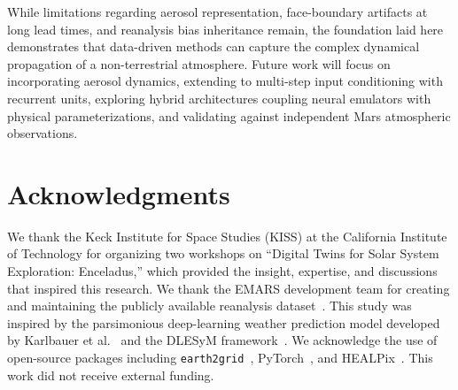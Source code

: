 \documentclass[11pt, a4paper, twocolumn]{article}
\begin{document}
While limitations regarding aerosol representation, face-boundary artifacts at long lead times, and reanalysis bias inheritance remain, the foundation laid here demonstrates that data-driven methods can capture the complex dynamical propagation of a non-terrestrial atmosphere. Future work will focus on incorporating aerosol dynamics, extending to multi-step input conditioning with recurrent units, exploring hybrid architectures coupling neural emulators with physical parameterizations, and validating against independent Mars atmospheric observations.

\section*{Acknowledgments}

We thank the Keck Institute for Space Studies (KISS) at the California Institute of Technology for organizing two workshops on ``Digital Twins for Solar System Exploration: Enceladus,'' which provided the insight, expertise, and discussions that inspired this research. We thank the EMARS development team for creating and maintaining the publicly available reanalysis dataset~\cite{greybush2019}. This study was inspired by the parsimonious deep-learning weather prediction model developed by Karlbauer et al.~\cite{karlbauer2024} and the DLESyM framework~\cite{wattmeyer2024}. We acknowledge the use of open-source packages including \texttt{earth2grid}~\cite{bonev2023spherical}, PyTorch~\cite{paszke2019pytorch}, and HEALPix~\cite{gorski2005healpix}. This work did not receive external funding.



\end{document}

